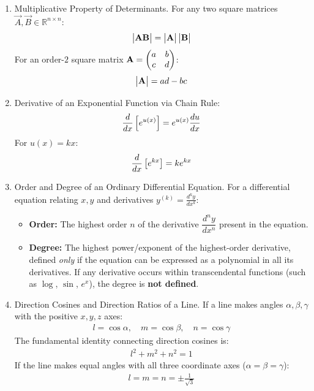 	\begin{enumerate}[label=\thesubsection.\arabic*, ref=\thesubsection.\theenumi]
		
		\item Multiplicative Property of Determinants.
		For any two square matrices $\vec{A}, \vec{B} \in \mathbb{R}^{n \times n}$:
		\begin{align}
			\begin{vmatrix}\mathbf{A}\mathbf{B}\end{vmatrix} = \begin{vmatrix}\mathbf{A}\end{vmatrix}\begin{vmatrix}\mathbf{B}\end{vmatrix} \label{eq:CBSE12-2019-det_mult}
		\end{align}
		For an order-$2$ square matrix $\mathbf{A} = \begin{pmatrix}a & b \\ c & d\end{pmatrix}$:
		\begin{align}
			\begin{vmatrix}\mathbf{A}\end{vmatrix} = ad - bc \label{eq:CBSE12-2019-det_2x2}
		\end{align}
		
		\item Derivative of an Exponential Function via Chain Rule:
		\begin{align}
			\frac{d}{dx}{}\left[e^{u\left(x\right)}\right] = e^{u\left(x\right)} \frac{du}{dx} \label{eq:CBSE12-2019-diff_exp_chain}
		\end{align}
		For $u(x) = kx$:
		\begin{align}
			\frac{d}{dx}{}\left[e^{kx}\right] = k e^{kx} \label{eq:CBSE12-2019-diff_exp_linear}
		\end{align}
		
		\item Order and Degree of an Ordinary Differential Equation.
		For a differential equation relating $x, y$ and derivatives $y^{(k)} = \frac{d^k y}{dx^k}$:
		\begin{itemize}
			\item \textbf{Order:} The highest order $n$ of the derivative $\dfrac{d^n y}{dx^n}$ present in the equation.
			\item \textbf{Degree:} The highest power/exponent of the highest-order derivative, defined \textit{only} if the equation can be expressed as a polynomial in all its derivatives. If any derivative occurs within transcendental functions (such as $\log$, $\sin$, $e^x$), the degree is \textbf{not defined}.
		\end{itemize}
		
		\item Direction Cosines and Direction Ratios of a Line.
		If a line makes angles $\alpha, \beta, \gamma$ with the positive $x, y, z$ axes:
		\begin{align}
			l = \cos\alpha, \quad m = \cos\beta, \quad n = \cos\gamma \label{eq:CBSE12-2019-dc_def}
		\end{align}
		The fundamental identity connecting direction cosines is:
		\begin{align}
			l^2 + m^2 + n^2 = 1 \label{eq:CBSE12-2019-dc_sum_sq}
		\end{align}
		If the line makes equal angles with all three coordinate axes ($\alpha = \beta = \gamma$):
		\begin{align}
			l = m = n = \pm \frac{1}{\sqrt{3}} \label{eq:CBSE12-2019-dc_equal}
		\end{align}
		

\end{enumerate}
